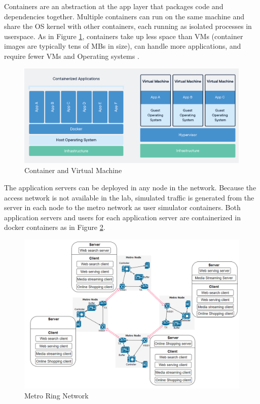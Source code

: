 \documentclass[conference]{IEEEtran}
\begin{document}
Containers are an abstraction at the app layer that packages code and dependencies together. Multiple containers can run on the same machine and share the OS kernel with other containers, each running as isolated processes in userspace. As in Figure \ref{fig:container_img}, containers take up less space than VMs (container images are typically tens of MBs in size), can handle more applications, and require fewer VMs and Operating systems \cite{docker}.

\begin{figure}[]
    \centering
        \includegraphics[scale = 0.25]{imgs/container-VM.png}
        \caption{Container and Virtual Machine}
        \label{fig:container_img}
    \end{figure}

The application servers can be deployed in any node in the network. Because the access network is not available in the lab, simulated traffic is generated from the server in each node to the metro network as user simulator containers. Both application servers and users for each application server are containerized in docker containers as in Figure \ref{fig:real_set_up}.

\begin{figure}[]
\centering
    \includegraphics[scale = 0.3]{imgs/real_experiment_set_up.png}
    \caption{Metro Ring Network}
    \label{fig:real_set_up}
\end{figure}
\end{document}
